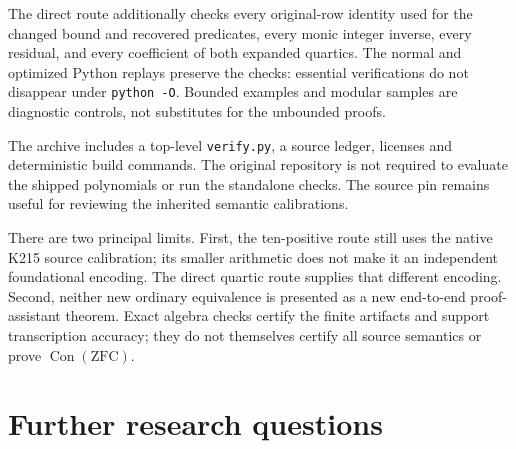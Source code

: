 \documentclass[11pt]{article}
\theoremstyle{remark}\newtheorem{remark}[theorem]{Remark}
\newcommand{\Con}{\operatorname{Con}}
\newcommand{\file}[1]{{\small\nolinkurl{#1}}}
\begin{document}
The direct route additionally checks every original-row identity used for
the changed bound and recovered predicates, every monic integer inverse,
every residual, and every coefficient of both expanded quartics. The normal
and optimized Python replays preserve the checks: essential verifications
do not disappear under \texttt{python -O}. Bounded examples and modular
samples are diagnostic controls, not substitutes for the unbounded proofs.

The archive includes a top-level \file{verify.py}, a source ledger, licenses
and deterministic build commands. The original repository is not required
to evaluate the shipped polynomials or run the standalone checks. The source
pin remains useful for reviewing the inherited semantic calibrations.

There are two principal limits. First, the ten-positive route still uses the
native K215 source calibration; its smaller arithmetic does not make it an
independent foundational encoding. The direct quartic route supplies that
different encoding. Second, neither new ordinary equivalence is presented
as a new end-to-end proof-assistant theorem. Exact algebra checks certify
the finite artifacts and support transcription accuracy; they do not
themselves certify all source semantics or prove $\Con(\mathrm{ZFC})$.

\section{Further research questions}
\end{document}
